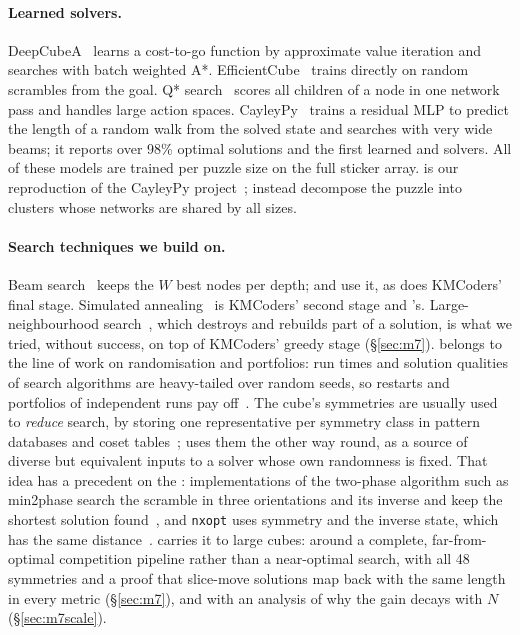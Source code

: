\paragraph{Learned solvers.}
DeepCubeA~\cite{agostinelli2019deepcubea} learns a cost-to-go function by approximate value iteration and
searches with batch weighted A*. EfficientCube~\cite{takano2023selfsupervision} trains directly on random
scrambles from the goal. Q* search~\cite{agostinelli2024qstar} scores all children of a node in one network
pass and handles large action spaces. CayleyPy~\cite{chervov2025cayleypy} trains a residual MLP to predict the
length of a random walk from the solved state and searches with very wide beams; it reports over 98\%
optimal  solutions and the first learned  and  solvers. All of these models are trained per
puzzle size on the full sticker array. \Mfour is our reproduction of the CayleyPy project~\cite{chervov2025cayleypy}; \FiveA instead
decompose the puzzle into clusters whose networks are shared by all sizes.

\paragraph{Search techniques we build on.}
Beam search~\cite{lowerre1976harpy} keeps the $W$ best nodes per depth; \Mfour and \FiveA use it, as
does KMCoders' final stage. Simulated annealing~\cite{kirkpatrick1983annealing} is KMCoders' second stage and
\Msix's. Large-neighbourhood search~\cite{shaw1998lns}, which destroys and rebuilds part of a solution, is
what we tried, without success, on top of KMCoders' greedy stage (\S\ref{sec:m7}). \Mseven belongs to the
line of work on randomisation and portfolios: run times and solution qualities of search algorithms are
heavy-tailed over random seeds, so restarts and portfolios of independent runs pay off~\cite{gomes1998boosting,
huberman1997portfolio,gomes2001portfolios}. The cube's symmetries are usually used to \emph{reduce} search,
by storing one representative per symmetry class in pattern databases and coset tables~\cite{rokicki2014diameter,
rokicki2018nxopt}; \Mseven uses them the other way round, as a source of diverse but equivalent inputs to a
solver whose own randomness is fixed. That idea has a precedent on the : implementations of the two-phase
algorithm such as min2phase search the scramble in three orientations and its inverse and keep the shortest solution
found~\cite{kociemba2phase,chen2phase}, and \texttt{nxopt} uses symmetry and the inverse state, which has the same
distance~\cite{rokicki2018nxopt}. \Mseven carries it to large cubes: around a complete, far-from-optimal competition
pipeline rather than a near-optimal search, with all 48 symmetries and a proof that slice-move solutions map back with the
same length in every metric (\S\ref{sec:m7}), and with an analysis of why the gain decays with $N$
(\S\ref{sec:m7scale}).

